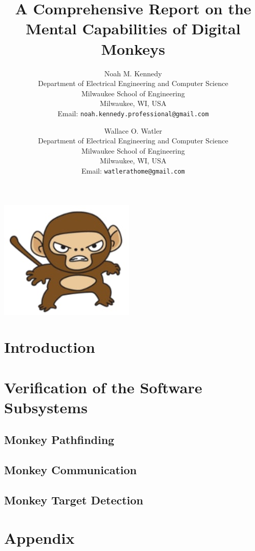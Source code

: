 \documentclass[11pt]{article}
\title{
    A Comprehensive Report on the Mental Capabilities of Digital Monkeys
}
\author{
    Noah M. Kennedy \\[3pt]
    {\small Department of Electrical Engineering and Computer Science} \\
    {\small Milwaukee School of Engineering} \\
    {\small Milwaukee, WI, USA} \\
    {\small Email: {\tt noah.kennedy.professional@gmail.com}} \\[12pt]
\and
    Wallace O. Watler \\[3pt]
    {\small Department of Electrical Engineering and Computer Science} \\
    {\small Milwaukee School of Engineering} \\
    {\small Milwaukee, WI, USA} \\
    {\small Email: {\tt watlerathome@gmail.com}} \\[12pt]
}
\date{}
\begin{document}
    \maketitle

    \abstract
    

    \includegraphics{monkey}

    \newpage

    \tableofcontents

    \newpage

    \section{Introduction}\label{sec:introduction}
    

    \section{Verification of the Software Subsystems}\label{sec:software-subsystems-results}

    \subsection{Monkey Pathfinding}\label{subsec:monkey-pathfinding}
    

    \subsection{Monkey Communication}\label{subsec:monkey-communication}
    

    \subsection{Monkey Target Detection}\label{subsec:monkey-target-detection}
    

    \section*{Appendix}\label{sec:appendix}

    \pagebreak

    \printbibliography
\end{document}
